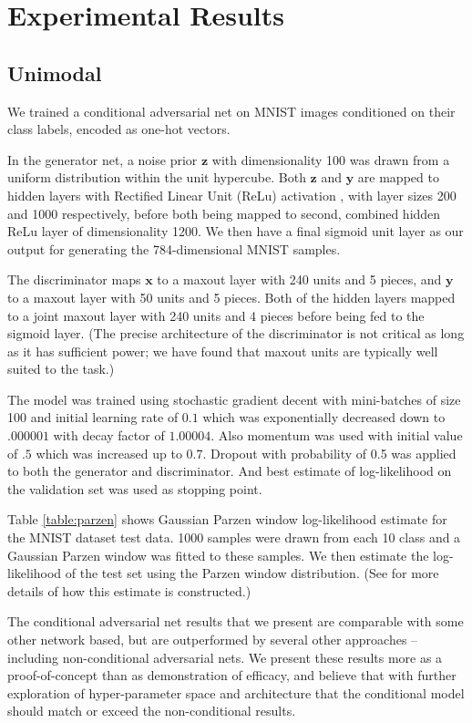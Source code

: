 \documentclass{article} %
\begin{document}
\section{Experimental Results}
\subsection{Unimodal}
We trained a conditional adversarial net on MNIST images conditioned
on their class labels, encoded as one-hot vectors.

In the generator net, a noise prior ${\bm{z}}$ with dimensionality 100 was drawn from a uniform distribution within the unit hypercube.
Both  ${\bm{z}}$ and ${\bm{y}}$ are mapped to hidden layers with Rectified Linear
Unit (ReLu) activation \cite{glorot2011deep, Jarrett-ICCV2009-small}, with
layer sizes 200 and 1000 respectively, before both being mapped to second, combined hidden ReLu layer of dimensionality 1200.
We then have a final sigmoid unit layer as our output for generating the 784-dimensional MNIST samples.

The discriminator maps ${\bm{x}}$ to a maxout \cite{Goodfellow_maxout_2013} layer with 240
units and 5 pieces, and  ${\bm{y}}$ to a maxout layer with 50 units and 5 pieces. Both of the hidden
layers mapped to a joint maxout layer with 240 units and 4 pieces before being fed to
the sigmoid layer. (The precise architecture of the discriminator is not critical as long as it has
sufficient power; we have found that maxout units are typically well suited to the task.)

The model was trained using stochastic gradient decent with mini-batches of size 100
and initial learning rate of $0.1$
which was exponentially decreased down to $.000001$ with decay factor of $1.00004$.
Also momentum was used with initial value of $.5$ which was increased up to $0.7$.
Dropout \cite{Hinton-et-al-arxiv2012} with probability of 0.5 was applied to both the generator and discriminator.
And best estimate of log-likelihood on the validation set was used as stopping point.

Table \ref{table:parzen} shows Gaussian Parzen window log-likelihood estimate for the MNIST dataset test data.
1000 samples were drawn from each 10 class and a Gaussian Parzen window  was fitted to these samples.
We then estimate the log-likelihood of the test set using the Parzen window distribution.
(See \cite{Goodfellow-et-al-NIPS2014-small} for more details of how this estimate is constructed.)

The conditional adversarial net results that we present are comparable with some other network based, but
are outperformed by several other approaches -- including non-conditional adversarial nets.
We present these results more as a proof-of-concept than as demonstration of efficacy, and believe that
with further exploration of hyper-parameter space and architecture that the conditional model should match
or exceed the non-conditional results.
\end{document}
